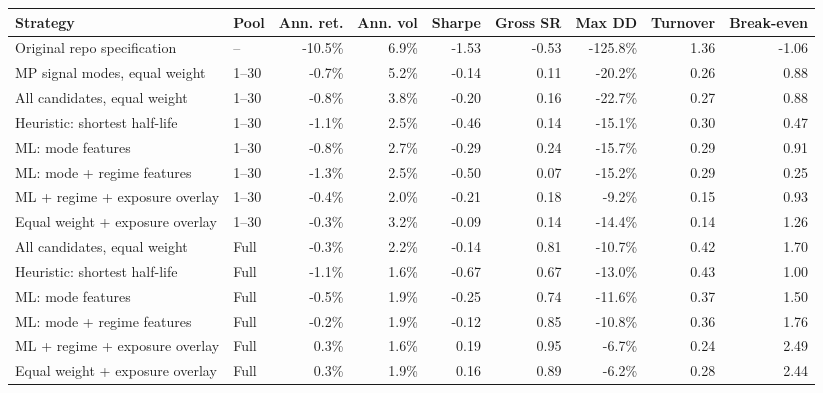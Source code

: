 \begin{tabular}{llrrrrrrr}
\toprule
Strategy & Pool & Ann. ret. & Ann. vol & Sharpe & Gross SR & Max DD & Turnover & Break-even \\
\midrule
Original repo specification & -- & -10.5\% & 6.9\% & -1.53 & -0.53 & -125.8\% & 1.36 & -1.06 \\
\midrule
MP signal modes, equal weight & 1--30 & -0.7\% & 5.2\% & -0.14 & 0.11 & -20.2\% & 0.26 & 0.88 \\
All candidates, equal weight & 1--30 & -0.8\% & 3.8\% & -0.20 & 0.16 & -22.7\% & 0.27 & 0.88 \\
Heuristic: shortest half-life & 1--30 & -1.1\% & 2.5\% & -0.46 & 0.14 & -15.1\% & 0.30 & 0.47 \\
ML: mode features & 1--30 & -0.8\% & 2.7\% & -0.29 & 0.24 & -15.7\% & 0.29 & 0.91 \\
ML: mode + regime features & 1--30 & -1.3\% & 2.5\% & -0.50 & 0.07 & -15.2\% & 0.29 & 0.25 \\
ML + regime + exposure overlay & 1--30 & -0.4\% & 2.0\% & -0.21 & 0.18 & -9.2\% & 0.15 & 0.93 \\
Equal weight + exposure overlay & 1--30 & -0.3\% & 3.2\% & -0.09 & 0.14 & -14.4\% & 0.14 & 1.26 \\
\midrule
All candidates, equal weight & Full & -0.3\% & 2.2\% & -0.14 & 0.81 & -10.7\% & 0.42 & 1.70 \\
Heuristic: shortest half-life & Full & -1.1\% & 1.6\% & -0.67 & 0.67 & -13.0\% & 0.43 & 1.00 \\
ML: mode features & Full & -0.5\% & 1.9\% & -0.25 & 0.74 & -11.6\% & 0.37 & 1.50 \\
ML: mode + regime features & Full & -0.2\% & 1.9\% & -0.12 & 0.85 & -10.8\% & 0.36 & 1.76 \\
ML + regime + exposure overlay & Full & 0.3\% & 1.6\% & 0.19 & 0.95 & -6.7\% & 0.24 & 2.49 \\
Equal weight + exposure overlay & Full & 0.3\% & 1.9\% & 0.16 & 0.89 & -6.2\% & 0.28 & 2.44 \\
\bottomrule
\end{tabular}